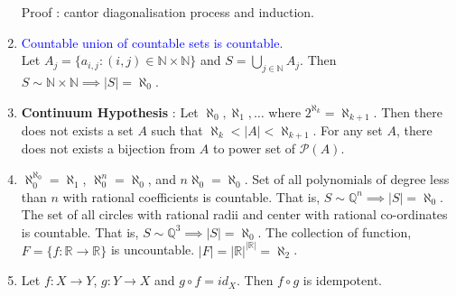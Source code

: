 \begin{enumerate}
		Proof : cantor diagonalisation process and induction.
	\item \textcolor{blue}{Countable union of countable sets is countable.}\\
		Let $A_j = \{ a_{i,j} : (i,j) \in \mathbb{N} \times \mathbb{N} \}$ and $S = \displaystyle\bigcup_{j \in \mathbb{N}} A_j$. Then $S \sim \mathbb{N} \times \mathbb{N} \implies |S| = \aleph_0$.
	\item \textbf{Continuum Hypothesis} : Let $\aleph_0,\aleph_1,\dots$ where $2^{\aleph_k} = \aleph_{k+1}$. Then there does not exists a set $A$ such that $\aleph_k < |A| < \aleph_{k+1}$.
		\subitem For any set $A$, there does not exists a bijection from $A$ to power set of $\mathcal{P}(A)$.
	\item $\aleph_0^{\aleph_0} = \aleph_1$, $ \aleph_0^n = \aleph_0$, and $n\aleph_0 = \aleph_0$.
		\subitem Set of all polynomials of degree less than $n$ with rational coefficients is countable. That is, $S \sim \mathbb{Q}^n \implies |S| = \aleph_0$.
		\subitem The set of all circles with rational radii and center with rational co-ordinates is countable. That is, $S \sim \mathbb{Q}^3 \implies |S| = \aleph_0$.
		\subitem The collection of function, $F = \{ f : \mathbb{R} \to \mathbb{R} \}$ is uncountable. $|F| = |\mathbb{R}|^{|\mathbb{R}|} = \aleph_2$.
	\item Let $f:X \to Y$, $g:Y \to X$ and $g \circ f = id_X$. Then $f \circ g$ is idempotent.
\end{enumerate}

